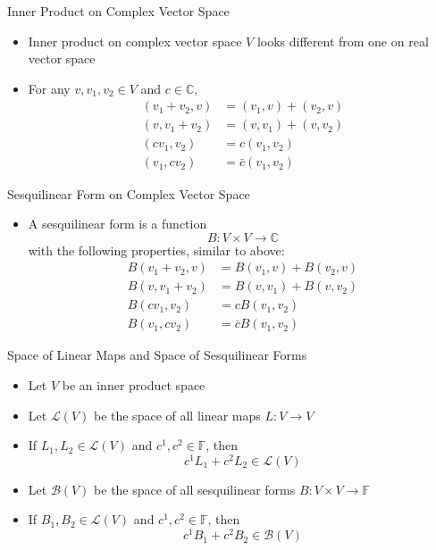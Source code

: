 \documentclass[usenames,dvipsnames,10pt]{beamer}
\newcommand\C{\mathbb{C}}
\newcommand\F{\mathbb{F}}
\begin{document}
\begin{frame}
  {Inner Product on Complex Vector Space}

  \begin{itemize}
  \item Inner product on complex vector space $V$ looks different from one on real vector space
  \item For any $v, v_1, v_2 \in V$ and $c \in \C$,
    \begin{align*}
      (v_1+v_2,v) &= (v_1,v) + (v_2,v)\\
      (v, v_1+v_2) &= (v,v_1) + (v,v_2)\\
      (cv_1,v_2) &= c(v_1,v_2)\\
      (v_1,cv_2) &= \bar{c}(v_1,v_2)
    \end{align*}
  \end{itemize}
\end{frame}

\begin{frame}
  {Sesquilinear Form on Complex Vector Space}

  \begin{itemize}
  \item A sesquilinear form is a function
    \[ B: V\times V\rightarrow \C \]
    with the following properties, similar to above:
    \begin{align*}
      B(v_1+v_2,v) &= B(v_1,v) + B(v_2,v)\\
      B(v, v_1+v_2) &= B(v,v_1) + B(v,v_2)\\
      B(cv_1,v_2) &= cB(v_1,v_2)\\
      B(v_1,cv_2) &= \bar{c}B(v_1,v_2)
    \end{align*}
  \end{itemize}
\end{frame}

\begin{frame}
  {Space of Linear Maps and Space of Sesquilinear Forms}

  \begin{itemize}
  \item Let $V$ be an inner product space
  \item Let $\mathcal{L}(V)$ be the space of all linear maps $L: V \rightarrow V$
  \item If $L_1, L_2 \in \mathcal{L}(V)$ and $c^1, c^2 \in \F$, then
    \[ c^1L_1+c^2L_2 \in \mathcal{L}(V) \]
  \item Let $\mathcal{B}(V)$ be the space of all sesquilinear forms $B: V \times V\rightarrow \F$
  \item If $B_1, B_2 \in \mathcal{L}(V)$ and $c^1, c^2 \in \F$, then
    \[ c^1B_1+c^2B_2 \in \mathcal{B}(V) \]
  \end{itemize}
\end{frame}
\end{document}
